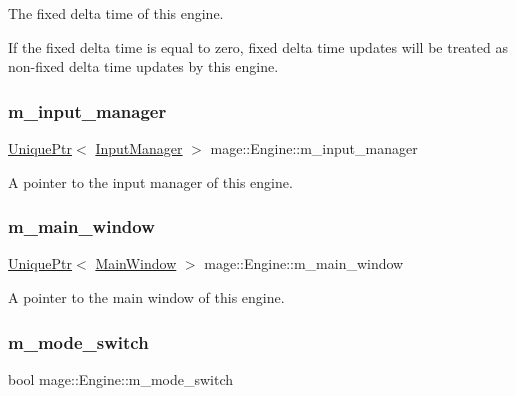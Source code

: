 The fixed delta time of this engine.

If the fixed delta time is equal to zero, fixed delta time updates will be treated as non-\/fixed delta time updates by this engine. \hypertarget{classmage_1_1_engine_a8e9048208a6a5c5b034aaa1cbdab28bc}{}\label{classmage_1_1_engine_a8e9048208a6a5c5b034aaa1cbdab28bc} 
\subsubsection{\texorpdfstring{m\+\_\+input\+\_\+manager}{m\_input\_manager}}
{\footnotesize\ttfamily \hyperlink{namespacemage_a3316d7143a973e37adf1110f2e80ca31}{Unique\+Ptr}$<$ \hyperlink{classmage_1_1_input_manager}{Input\+Manager} $>$ mage\+::\+Engine\+::m\+\_\+input\+\_\+manager\hspace{0.3cm}{\ttfamily [private]}}

A pointer to the input manager of this engine. \hypertarget{classmage_1_1_engine_a3aea7e8c0c1247cac570334a3d3543d6}{}\label{classmage_1_1_engine_a3aea7e8c0c1247cac570334a3d3543d6} 
\subsubsection{\texorpdfstring{m\+\_\+main\+\_\+window}{m\_main\_window}}
{\footnotesize\ttfamily \hyperlink{namespacemage_a3316d7143a973e37adf1110f2e80ca31}{Unique\+Ptr}$<$ \hyperlink{classmage_1_1_main_window}{Main\+Window} $>$ mage\+::\+Engine\+::m\+\_\+main\+\_\+window\hspace{0.3cm}{\ttfamily [private]}}

A pointer to the main window of this engine. \hypertarget{classmage_1_1_engine_aa5cb2e0b7bb2c4a9020e79ab832ee221}{}\label{classmage_1_1_engine_aa5cb2e0b7bb2c4a9020e79ab832ee221} 
\subsubsection{\texorpdfstring{m\+\_\+mode\+\_\+switch}{m\_mode\_switch}}
{\footnotesize\ttfamily bool mage\+::\+Engine\+::m\+\_\+mode\+\_\+switch\hspace{0.3cm}{\ttfamily [private]}}

